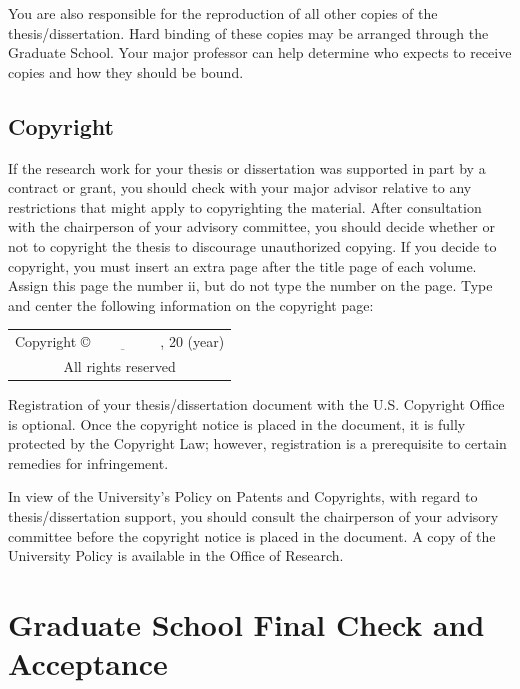 You are also responsible for the reproduction of all other copies of
the the\-sis/dis\-ser\-ta\-tion. Hard binding of these copies may be
arranged through the Graduate School. Your major professor can help
determine who expects to receive copies and how they should be bound.

\subsection{Copyright}
\label{sec:AssigningCopyright}

If the research work for your thesis or dissertation was supported in
part by a contract or grant, you should check with your major advisor
relative to any restrictions that might apply to copyrighting the
material. After consultation with the chairperson of your advisory
committee, you should decide whether or not to copyright the thesis to
discourage unauthorized copying. If you decide to copyright, you must
insert an extra page after the title page of each volume. Assign this
page the number ii, but do not type the number on the page. Type and
center the following information on the copyright page:
\begin{center}
  \begin{tabular}[h]{|c|} \hline
    Copyright \copyright $\underbar{\quad\quad\quad\quad\quad}$, 20 (year) \\
    All rights reserved \\ \hline
  \end{tabular}
\end{center}

Registration of your the\-sis/dis\-ser\-ta\-tion document with the
U.S.  Copyright Office is optional. Once the copyright notice is
placed in the document, it is fully protected by the Copyright Law;
however, registration is a prerequisite to certain remedies for
infringement.

In view of the University's Policy on Patents and Copyrights, with
regard to the\-sis/dis\-ser\-ta\-tion support, you should consult the
chairperson of your advisory committee before the copyright notice is
placed in the document. A copy of the University Policy is available
in the Office of Research.

\section{Graduate School Final Check and Acceptance}
\label{sec:GraduateSchoolFinalCheckAndAcceptance}

